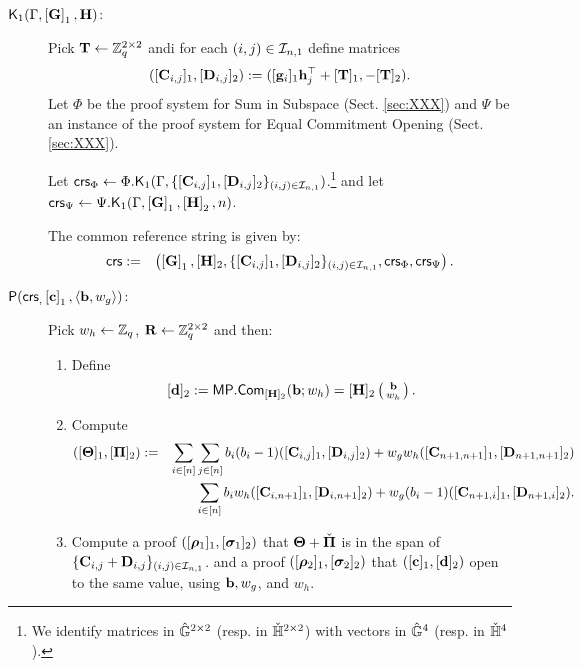 \begin{description}


\item[{$\mathsf{K}_1(\Gamma, \left[\mathbf{{G}}\right]_1,\mathbf{{H}})$}:]
Pick $\mathbf{{T}}\gets\mathbb{Z}_q^{2\times 2}$ andi for each $(i,j)\in\mathcal{I}_{n,1}$ define matrices
$$([\mathbf{{C}}_{i,j}]_1,[\mathbf{{D}}_{i,j}]_2):=([\mathbf{g}_i]_1\mathbf{h}_j^\top+[\mathbf{{T}}]_1,-[\mathbf{{T}}]_2).$$
Let $\Phi$ be the proof system for Sum in Subspace 
(Sect. \ref{sec:XXX}) and $\Psi$
be an instance of the proof system for Equal Commitment Opening (Sect. \ref{sec:XXX}).

Let
$\mathsf{crs}_\Phi \gets \Phi.\mathsf{K}_1(\Gamma, \{[\mathbf{{C}}_{i,j}]_1,[\mathbf{{D}}_{i,j}]_2\}_{(i,j)\in\mathcal{I}_{n,1}})$.\footnote{We identify
matrices in ${\hat{\mathbb{G}}}^{2 \times 2}$ (resp. in ${\check{\mathbb{H}}}^{2 \times 2}$) with vectors in ${\hat{\mathbb{G}}}^{4}$ (resp. in ${\check{\mathbb{H}}}^{4}$).} and let $\mathsf{crs}_\Psi \gets \Psi.\mathsf{K}_1(\Gamma, \left[\mathbf{{G}}\right]_1,\left[\mathbf{{H}}\right]_2,n)$. 

The common reference string is given by:
\begin{eqnarray*}
\mathsf{crs}&:=&\left(  \left[\mathbf{{G}}\right]_1,
    [\mathbf{{H}}]_2, \{[\mathbf{{C}}_{i,j}]_1, [\mathbf{{D}}_{i,j}]_2 \}_{(i,j) \in \mathcal{I}_{n,1}},\mathsf{crs}_\Phi,\mathsf{crs}_\Psi \right).
 \end{eqnarray*}
\item[$\mathsf{P}(\mathsf{crs}_, \left[\mathbf{c}\right]_1, \langle \mathbf{b}, w_g \rangle)$:]
Pick $w_h \gets \mathbb{Z}_q$,  $\mathbf{{R}} \gets \mathbb{Z}_q^{2\times 2}$ and then: 
\begin{enumerate}
\item Define 
$$[\mathbf{d}]_2:= \mathsf{MP}.\mathsf{Com}_{[\mathbf{{H}}]_2} (\mathbf{b};w_h) =  [\mathbf{{H}}]_2\left(\begin{smallmatrix}\mathbf{b}\\w_h\end{smallmatrix}\right).$$ 
\item Compute 
\begin{eqnarray*}
([\mathbf{{\Theta}}]_1, [\mathbf{{\Pi}}]_2) & := &
\sum_{i\in[n]}\sum_{j\in[n]}b_i(b_i-1)([\mathbf{{C}}_{i,j}]_1,[\mathbf{{D}}_{i,j}]_2)+ w_gw_h([\mathbf{{C}}_{n+1,n+1}]_1,[\mathbf{{D}}_{n+1,n+1}]_2) \\
& &
 \sum_{i \in [n]}
 b_i w_h  ([\mathbf{{C}}_{i,n+1}]_1,[\mathbf{{D}}_{i,n+1}]_2) +
 w_g(b_i-1) ([\mathbf{{C}}_{n+1,i}]_1,[\mathbf{{D}}_{n+1,i}]_2).
\end{eqnarray*}

\item Compute a proof $([{\boldsymbol \rho}_1]_1,[{\boldsymbol \sigma}_1]_2)$
that $\mathbf{{\Theta}}+\check{\mathbf{{\Pi}}}$ is in the span of 
$\{\mathbf{{C}}_{i,j}+\mathbf{{D}}_{i,j}\}_{(i,j)\in\mathcal{I}_{n,1}}$.
and a proof $([{\boldsymbol \rho}_{2}]_1, [{\boldsymbol \sigma}_{2}]_2)$
that
$([\mathbf{c}]_1,[\mathbf{d}]_2)$ open to the same value,
using $\mathbf{b},w_g$, and $w_h$. \\
\end{enumerate}


\end{description}
